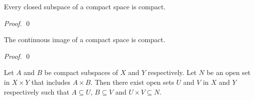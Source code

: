 \begin{proposition}
    \label{proposition:closed_subspace_compact}
    Every closed subspace of a compact space is compact.
\end{proposition}

\begin{proof}
    \pf
    \qed
\end{proof}

\begin{theorem}
    \label{theorem:continuous_image_compact}
    The continuous image of a compact space is compact.
\end{theorem}

\begin{proof}
    \pf
    \qed
\end{proof}

\begin{theorem}
    \label{theorem:generalized_tube_lemma}
    Let $A$ and $B$ be compact subspaces of $X$ and $Y$ respectively. Let $N$ be an open set in $X \times Y$ that includes $A \times B$.
    Then there exist open sets $U$ and $V$ in $X$ and $Y$ respectively such that $A \subseteq U$, $B \subseteq V$ and $U \times V \subseteq N$.
\end{theorem}

